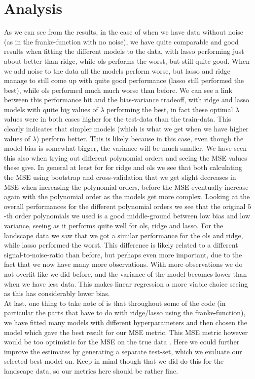 \documentclass{article}
\begin{document}
\section{Analysis}
As we can see from the results, in the case of when we have data without noise
(as in the franke-function with no noise), we have quite comparable and good
results when fitting the different models to the data, with lasso performing
just about better than ridge, while ols performs the worst, but still quite
good. When we add noise to the data all the models perform worse, but lasso and
ridge manage to still come up with quite good performance (lasso still performed
the best), while ols performed much much worse than before. We can see a link
between this performance hit and the bias-variance tradeoff, with ridge and
lasso models with quite big values of $\lambda$ performing the best, in fact
these optimal $\lambda$ values were in both cases higher for the test-data than
the train-data. This clearly indicates that simpler models (which is what we get
when we have higher values of $\lambda$) perform better. This is likely because
in this case, even though the model bias is somewhat bigger, the variance will
be much smaller. We have seen this also when trying out different polynomial
orders and seeing the MSE values these give. In general at least for for ridge
and ols we see that both calculating the MSE using bootstrap and
cross-validation that we get slight decreases in MSE when increasing the
polynomial orders, before the MSE eventually increase again with the polynomial
order as the models get more complex. Looking at the overall performances for
the different polynomial orders we see that the original $5$-th order
polynomials we used is a good middle-ground between low bias and low variance,
seeing as it performs quite well for ols, ridge and lasso. For the landscape
data we saw that we got a similar performance for the ols and ridge, while lasso
performed the worst. This difference is likely related to a different
signal-to-noise-ratio than before, but perhaps even more important, due to the
fact that we now have many more observations. With more observations we do not
overfit like we did before, and the variance of the model becomes lower than
when we have less data. This makes linear regression a more viable choice seeing
as this has considerably lower bias.\\
At last, one thing to take note of is that throughout some of the code (in
particular the parts that have to do with ridge/lasso using the
franke-function), we have fitted many models with different hyperparameters and
then chosen the model which gave the best result for our MSE metric. This MSE
metric however would be too optimistic for the MSE on the true data
\cite[s.~7.2]{hastie2009elements}.  Here we could further improve the estimates
by generating a separate test-set, which we evaluate our selected best model on.
Keep in mind though that we did do this for the landscape data, so our metrics
here should be rather fine.
\end{document}

